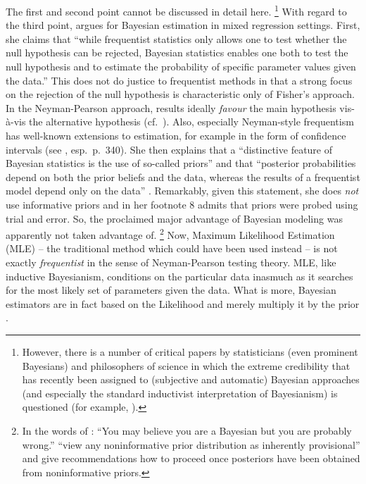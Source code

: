 \documentclass[USenglish]{article}
\begin{document}
The first and second point cannot be discussed in detail here.%
\footnote{However, there is a number of critical papers by statisticians (even prominent Bayesians) and philosophers of science in which the extreme credibility that has recently been assigned to (subjective and automatic) Bayesian approaches (and especially the standard inductivist interpretation of Bayesianism) is questioned (for example, \citealp{GelmanShalizi2013,Mayo2011,Senn2011}).}
With regard to the third point, \citet[251--252]{Levshina2016} argues for Bayesian estimation in mixed regression settings.
First, she claims that ``while frequentist statistics only allows one to test whether the null hypothesis can be rejected, Bayesian statistics enables one both to test the null hypothesis and to estimate the probability of specific parameter values given the data.''
This does not do justice to frequentist methods in that a strong focus on the rejection of the null hypothesis is characteristic only of Fisher's approach.
In the Neyman-Pearson approach, results ideally \textit{favour} the main hypothesis vis-à-vis the alternative hypothesis (cf.\ \citealp{Lehmann1993,Lehmann2011,Perezgonzalez2015}).
Also, especially Neyman-style frequentism has well-known extensions to estimation, for example in the form of confidence intervals (see \citealp{GreenlandEa2016}, esp.\ p.\ 340).
She then explains that a ``distinctive feature of Bayesian statistics is the use of so-called priors'' and that ``posterior probabilities depend on both the prior beliefs and the data, whereas the results of a frequentist model depend only on the data'' \cite[252]{Levshina2016}.
Remarkably, given this statement, she does \textit{not} use informative priors and in her footnote 8 \cite[252]{Levshina2016} admits that priors were probed using trial and error.
So, the proclaimed major advantage of Bayesian modeling was apparently not taken advantage of.%
\footnote{In the words of \cite{Senn2011}: ``You may believe you are a Bayesian but you are probably wrong.''
\citet[347--348]{GelmanHill2006} ``view any noninformative prior distribution as inherently provisional'' and give recommendations how to proceed once posteriors have been obtained from noninformative priors.}
Now, Maximum Likelihood Estimation (MLE) -- the traditional method which could have been used instead -- is not exactly \textit{frequentist} in the sense of Neyman-Pearson testing theory.
MLE, like inductive Bayesianism, conditions on the particular data inasmuch as it searches for the most likely set of parameters given the data.
What is more, Bayesian estimators are in fact based on the Likelihood and merely multiply it by the prior \citep[6--8]{GelmanEa2014}.
\end{document}
